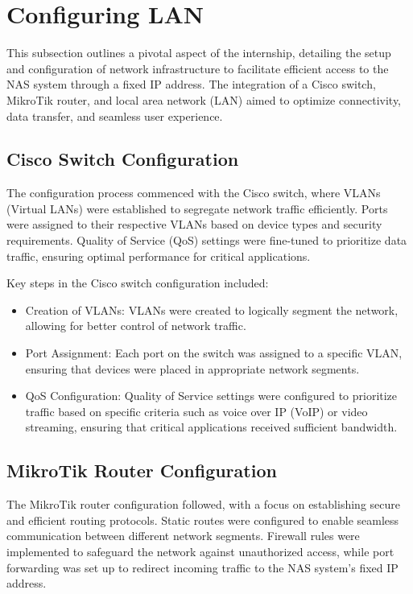 \section{Configuring LAN}

This subsection outlines a pivotal aspect of the internship, detailing the setup and configuration of network infrastructure to facilitate efficient access to the NAS system through a fixed IP address. The integration of a Cisco switch, MikroTik router, and local area network (LAN) aimed to optimize connectivity, data transfer, and seamless user experience.

\subsection{Cisco Switch Configuration}

The configuration process commenced with the Cisco switch, where VLANs (Virtual LANs) were established to segregate network traffic efficiently. Ports were assigned to their respective VLANs based on device types and security requirements. Quality of Service (QoS) settings were fine-tuned to prioritize data traffic, ensuring optimal performance for critical applications.

Key steps in the Cisco switch configuration included:

\begin{itemize}
    \item Creation of VLANs: VLANs were created to logically segment the network, allowing for better control of network traffic.
    
    \item Port Assignment: Each port on the switch was assigned to a specific VLAN, ensuring that devices were placed in appropriate network segments.
    
    \item QoS Configuration: Quality of Service settings were configured to prioritize traffic based on specific criteria such as voice over IP (VoIP) or video streaming, ensuring that critical applications received sufficient bandwidth.
\end{itemize}

\subsection{MikroTik Router Configuration}

The MikroTik router configuration followed, with a focus on establishing secure and efficient routing protocols. Static routes were configured to enable seamless communication between different network segments. Firewall rules were implemented to safeguard the network against unauthorized access, while port forwarding was set up to redirect incoming traffic to the NAS system's fixed IP address.

